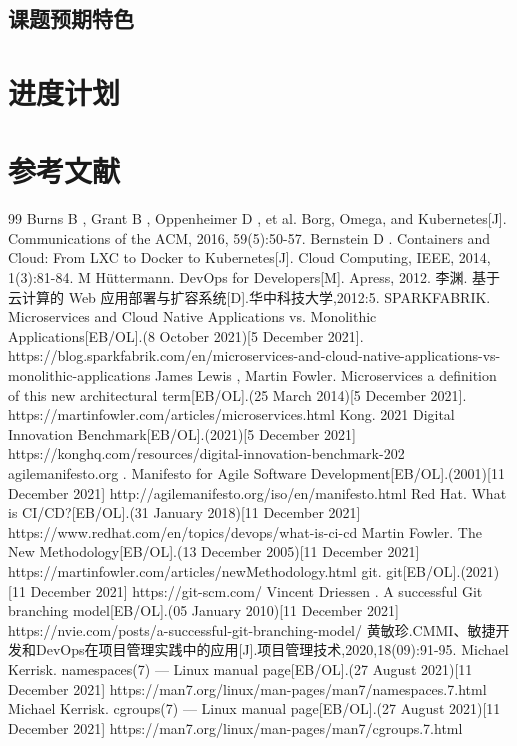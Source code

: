 \documentclass{article}
\begin{document}
\subsection{课题预期特色}

\section{进度计划}

\section{参考文献}
\begin{thebibliography} {99}
     Burns B , Grant B , Oppenheimer D , et al. Borg, Omega, and Kubernetes[J]. Communications of the ACM, 2016, 59(5):50-57.
     Bernstein D . Containers and Cloud: From LXC to Docker to Kubernetes[J]. Cloud Computing, IEEE, 2014, 1(3):81-84.
     M Hüttermann. DevOps for Developers[M]. Apress, 2012.
     李渊. 基于云计算的 Web 应用部署与扩容系统[D].华中科技大学,2012:5.
     SPARKFABRIK. Microservices and Cloud Native Applications vs. Monolithic Applications[EB/OL].(8 October 2021)[5 December 2021]. https://blog.sparkfabrik.com/en/microservices-and-cloud-native-applications-vs-monolithic-applications
     James Lewis , Martin Fowler. Microservices a definition of this new architectural term[EB/OL].(25 March 2014)[5 December 2021]. https://martinfowler.com/articles/microservices.html
     Kong. 2021 Digital Innovation Benchmark[EB/OL].(2021)[5 December 2021] https://konghq.com/resources/digital-innovation-benchmark-202
    agilemanifesto.org . Manifesto for Agile Software Development[EB/OL].(2001)[11 December 2021] http://agilemanifesto.org/iso/en/manifesto.html
    Red Hat. What is CI/CD?[EB/OL].(31 January 2018)[11 December 2021] https://www.redhat.com/en/topics/devops/what-is-ci-cd
    Martin Fowler. The New Methodology[EB/OL].(13 December 2005)[11 December 2021] https://martinfowler.com/articles/newMethodology.html 
    git. git[EB/OL].(2021)[11 December 2021] https://git-scm.com/
    Vincent Driessen . A successful Git branching model[EB/OL].(05 January  2010)[11 December 2021] https://nvie.com/posts/a-successful-git-branching-model/
    黄敏珍.CMMI、敏捷开发和DevOps在项目管理实践中的应用[J].项目管理技术,2020,18(09):91-95.
    Michael Kerrisk. namespaces(7) — Linux manual page[EB/OL].(27 August 2021)[11 December 2021] https://man7.org/linux/man-pages/man7/namespaces.7.html
    Michael Kerrisk. cgroups(7) — Linux manual page[EB/OL].(27 August 2021)[11 December 2021] https://man7.org/linux/man-pages/man7/cgroups.7.html
  \end{thebibliography}
\end{document}
